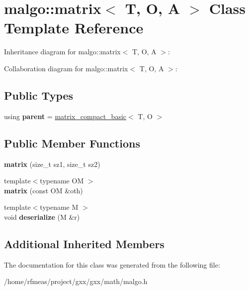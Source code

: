 \hypertarget{classmalgo_1_1matrix}{}\section{malgo\+:\+:matrix$<$ T, O, A $>$ Class Template Reference}
\label{classmalgo_1_1matrix}


Inheritance diagram for malgo\+:\+:matrix$<$ T, O, A $>$\+:


Collaboration diagram for malgo\+:\+:matrix$<$ T, O, A $>$\+:
\subsection*{Public Types}
\begin{DoxyCompactItemize}
\item 
using {\bfseries parent} = \hyperlink{classmalgo_1_1matrix__compact__basic}{matrix\+\_\+compact\+\_\+basic}$<$ T, O $>$\hypertarget{classmalgo_1_1matrix_a83ca1a501f5a046e991f2ffbd15921ac}{}\label{classmalgo_1_1matrix_a83ca1a501f5a046e991f2ffbd15921ac}

\end{DoxyCompactItemize}
\subsection*{Public Member Functions}
\begin{DoxyCompactItemize}
\item 
{\bfseries matrix} (size\+\_\+t sz1, size\+\_\+t sz2)\hypertarget{classmalgo_1_1matrix_a74a585fae088b31049e55a59ab2022df}{}\label{classmalgo_1_1matrix_a74a585fae088b31049e55a59ab2022df}

\item 
{\footnotesize template$<$typename OM $>$ }\\{\bfseries matrix} (const OM \&oth)\hypertarget{classmalgo_1_1matrix_ade27b5bab61c40a183e7c71888d66edb}{}\label{classmalgo_1_1matrix_ade27b5bab61c40a183e7c71888d66edb}

\item 
{\footnotesize template$<$typename M $>$ }\\void {\bfseries deserialize} (M \&r)\hypertarget{classmalgo_1_1matrix_a70054b2467b19dbdf9bad6f85eda44da}{}\label{classmalgo_1_1matrix_a70054b2467b19dbdf9bad6f85eda44da}

\end{DoxyCompactItemize}
\subsection*{Additional Inherited Members}


The documentation for this class was generated from the following file\+:\begin{DoxyCompactItemize}
\item 
/home/rfmeas/project/gxx/gxx/math/malgo.\+h\end{DoxyCompactItemize}

